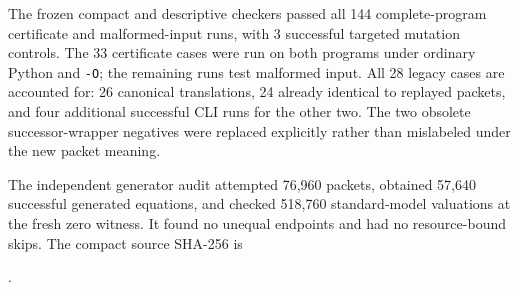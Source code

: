 The frozen compact and descriptive checkers passed all 144 complete-program certificate and malformed-input runs, with 3 successful targeted mutation controls. The 33 certificate cases were run on both programs under ordinary Python and \texttt{-O}; the remaining runs test malformed input. All 28 legacy cases are accounted for: 26 canonical translations, 24 already identical to replayed packets, and four additional successful CLI runs for the other two. The two obsolete successor-wrapper negatives were replaced explicitly rather than mislabeled under the new packet meaning.

The independent generator audit attempted 76,960 packets, obtained 57,640 successful generated equations, and checked 518,760 standard-model valuations at the fresh zero witness. It found no unequal endpoints and had no resource-bound skips. The compact source SHA-256 is
\begin{center}\footnotesize{}.\end{center}

